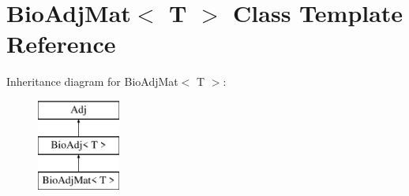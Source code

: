 \hypertarget{class_bio_adj_mat}{}\section{Bio\+Adj\+Mat$<$ T $>$ Class Template Reference}
\label{class_bio_adj_mat}
Inheritance diagram for Bio\+Adj\+Mat$<$ T $>$\+:\begin{figure}[H]
\begin{center}
\leavevmode
\includegraphics[height=3.000000cm]{class_bio_adj_mat}
\end{center}
\end{figure}
